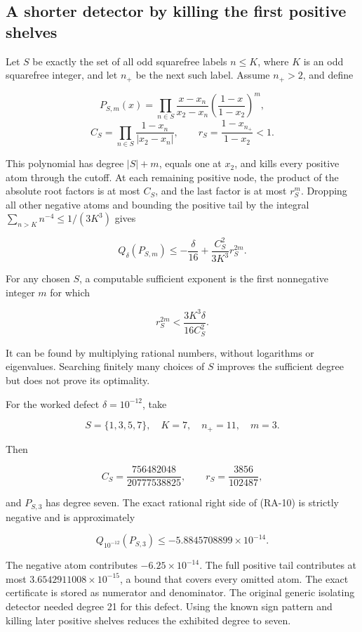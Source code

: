 \hypertarget{v11-resolution_full-a-shorter-detector-by-killing-the-first-positive-shelves}{%
\subsection{A shorter detector by killing the first positive
shelves}\label{v11-resolution_full-a-shorter-detector-by-killing-the-first-positive-shelves}}

Let \(S\) be exactly the set of all odd squarefree labels \(n\le K\),
where \(K\) is an odd squarefree integer, and let \(n_+\) be the next
such label. Assume \(n_+>2\), and define

\[
P_{S,m}(x)=\prod_{n\in S}\frac{x-x_n}{x_2-x_n}
\left(\frac{1-x}{1-x_2}\right)^m,
\] \[
C_S=\prod_{n\in S}\frac{1-x_n}{|x_2-x_n|},
\qquad r_S=\frac{1-x_{n_+}}{1-x_2}<1.
\]

This polynomial has degree \(|S|+m\), equals one at \(x_2\), and kills
every positive atom through the cutoff. At each remaining positive node,
the product of the absolute root factors is at most \(C_S\), and the
last factor is at most \(r_S^m\). Dropping all other negative atoms and
bounding the positive tail by the integral
\(\sum_{n>K}n^{-4}\le1/(3K^3)\) gives

\[
\boxed{Q_\delta(P_{S,m})\le-\frac\delta{16}
 +\frac{C_S^2}{3K^3}r_S^{2m}.}
\tag{RA-10}
\]

For any chosen \(S\), a computable sufficient exponent is the first
nonnegative integer \(m\) for which

\[
 r_S^{2m}<\frac{3K^3\delta}{16C_S^2}.
\]

It can be found by multiplying rational numbers, without logarithms or
eigenvalues. Searching finitely many choices of \(S\) improves the
sufficient degree but does not prove its optimality.

For the worked defect \(\delta=10^{-12}\), take

\[
S=\{1,3,5,7\},\quad K=7,\quad n_+=11,\quad m=3.
\]

Then

\[
C_S=\frac{756482048}{20777538825},\qquad
r_S=\frac{3856}{102487},
\]

and \(P_{S,3}\) has degree seven. The exact rational right side of
(RA-10) is strictly negative and is approximately

\[
\boxed{Q_{10^{-12}}(P_{S,3})\le-5.8845708899\times10^{-14}.}
\]

The negative atom contributes \(-6.25\times10^{-14}\). The full positive
tail contributes at most \(3.6542911008\times10^{-15}\), a bound that
covers every omitted atom. The exact certificate is stored as numerator
and denominator. The original generic isolating detector needed degree
21 for this defect. Using the known sign pattern and killing later
positive shelves reduces the exhibited degree to seven.

